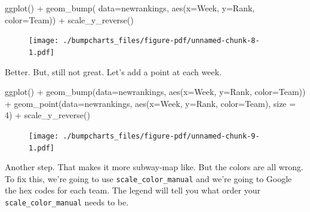 \documentclass[
  letterpaper,
  DIV=11,
  numbers=noendperiod]{scrreprt}
\newenvironment{Shaded}{\begin{snugshade}}{\end{snugshade}}
\newcommand{\AttributeTok}[1]{\textcolor[rgb]{0.40,0.45,0.13}{#1}}
\newcommand{\DecValTok}[1]{\textcolor[rgb]{0.68,0.00,0.00}{#1}}
\newcommand{\FunctionTok}[1]{\textcolor[rgb]{0.28,0.35,0.67}{#1}}
\newcommand{\NormalTok}[1]{\textcolor[rgb]{0.00,0.23,0.31}{#1}}
\newcommand{\SpecialCharTok}[1]{\textcolor[rgb]{0.37,0.37,0.37}{#1}}
\begin{document}
\begin{Shaded}
\begin{Highlighting}[]
\FunctionTok{ggplot}\NormalTok{() }\SpecialCharTok{+} 
  \FunctionTok{geom\_bump}\NormalTok{(}
    \AttributeTok{data=}\NormalTok{newrankings, }\FunctionTok{aes}\NormalTok{(}\AttributeTok{x=}\NormalTok{Week, }\AttributeTok{y=}\NormalTok{Rank, }\AttributeTok{color=}\NormalTok{Team)) }\SpecialCharTok{+} 
  \FunctionTok{scale\_y\_reverse}\NormalTok{()}
\end{Highlighting}
\end{Shaded}

\begin{figure}[H]

{\centering \texttt{[image: ./bumpcharts\_files/figure-pdf/unnamed-chunk-8-1.pdf]}

}

\end{figure}

Better. But, still not great. Let's add a point at each week.

\begin{Shaded}
\begin{Highlighting}[]
\FunctionTok{ggplot}\NormalTok{() }\SpecialCharTok{+} 
  \FunctionTok{geom\_bump}\NormalTok{(}\AttributeTok{data=}\NormalTok{newrankings, }\FunctionTok{aes}\NormalTok{(}\AttributeTok{x=}\NormalTok{Week, }\AttributeTok{y=}\NormalTok{Rank, }\AttributeTok{color=}\NormalTok{Team)) }\SpecialCharTok{+} 
  \FunctionTok{geom\_point}\NormalTok{(}\AttributeTok{data=}\NormalTok{newrankings, }\FunctionTok{aes}\NormalTok{(}\AttributeTok{x=}\NormalTok{Week, }\AttributeTok{y=}\NormalTok{Rank, }\AttributeTok{color=}\NormalTok{Team), }\AttributeTok{size =} \DecValTok{4}\NormalTok{) }\SpecialCharTok{+}
  \FunctionTok{scale\_y\_reverse}\NormalTok{() }
\end{Highlighting}
\end{Shaded}

\begin{figure}[H]

{\centering \texttt{[image: ./bumpcharts\_files/figure-pdf/unnamed-chunk-9-1.pdf]}

}

\end{figure}

Another step. That makes it more subway-map like. But the colors are all
wrong. To fix this, we're going to use \texttt{scale\_color\_manual} and
we're going to Google the hex codes for each team. The legend will tell
you what order your \texttt{scale\_color\_manual} needs to be.
\end{document}
